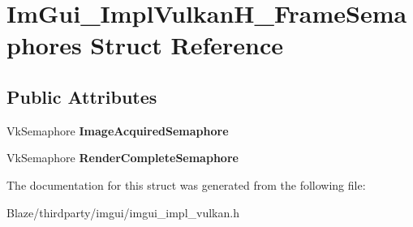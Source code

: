 \hypertarget{structImGui__ImplVulkanH__FrameSemaphores}{}\section{Im\+Gui\+\_\+\+Impl\+Vulkan\+H\+\_\+\+Frame\+Semaphores Struct Reference}
\label{structImGui__ImplVulkanH__FrameSemaphores}
\subsection*{Public Attributes}
\begin{DoxyCompactItemize}
\item 
\mbox{\label{structImGui__ImplVulkanH__FrameSemaphores_ad396afd28149848364513e2015c992d1}} 
Vk\+Semaphore {\bfseries Image\+Acquired\+Semaphore}
\item 
\mbox{\label{structImGui__ImplVulkanH__FrameSemaphores_aa5dad94e9e02ef1cfd2ef171bb72f3e8}} 
Vk\+Semaphore {\bfseries Render\+Complete\+Semaphore}
\end{DoxyCompactItemize}


The documentation for this struct was generated from the following file\+:\begin{DoxyCompactItemize}
\item 
Blaze/thirdparty/imgui/imgui\+\_\+impl\+\_\+vulkan.\+h\end{DoxyCompactItemize}
